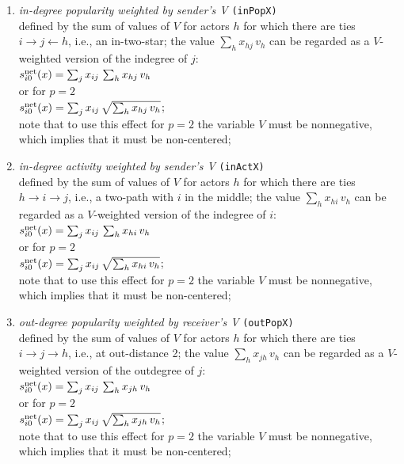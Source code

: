 \documentclass[a4paper,fleqn,11pt]{article}
\newcommand{\+}{\, + \,}
\newcommand{\vit}{\theenumi}
\begin{document}
\begin{enumerate}
 \item {\em in-degree popularity weighted by sender's V }
  \texttt{(inPopX)}\\
 defined by the sum of values of $V$ for actors $h$
 for which there are ties  $ i \rightarrow j \leftarrow h$,
 i.e., an in-two-star;
 the value $\sum_h x_{hj}\,v_h$ can be regarded as a $V$-weighted
 version of the indegree of $j$:\\
 $s^{\rm net}_{i\vit}(x) =  \sum_j x_{ij}\, \sum_h x_{hj}\,v_h  $ \\
 or for $p=2$ \\
   $s^{\rm net}_{i\vit}(x) =  \sum_j x_{ij}\, \sqrt{\sum_h x_{hj}\,v_h}   $;\\
 note that to use this effect for $p=2$ the variable $V$ must be nonnegative,
 which implies that it must be non-centered;

 \item {\em in-degree activity weighted by sender's V } \texttt{(inActX)}\\
 defined by the sum of values of $V$ for actors $h$
 for which there are ties  $h \rightarrow i \rightarrow j$,
 i.e., a two-path with $i$ in the middle;
 the value $\sum_h x_{hi}\,v_h$ can be regarded as a $V$-weighted
 version of the indegree of $i$:\\
 $s^{\rm net}_{i\vit}(x) =  \sum_j x_{ij}\, \sum_h x_{hi}\,v_h  $ \\
 or for $p=2$ \\
   $s^{\rm net}_{i\vit}(x) =  \sum_j x_{ij}\, \sqrt{\sum_h x_{hi}\,v_h}   $;\\
 note that to use this effect for $p=2$ the variable $V$ must be nonnegative,
 which implies that it must be non-centered;


 \item {\em out-degree popularity weighted by receiver's V }  \texttt{(outPopX)}\\
 defined by the sum of values of $V$ for actors $h$
 for which there are ties  $ i \rightarrow j \rightarrow h$,
 i.e., at out-distance 2;
 the value $\sum_h x_{jh}\,v_h$ can be regarded as a $V$-weighted
 version of the outdegree of $j$:\\
 $s^{\rm net}_{i\vit}(x) =  \sum_j x_{ij}\, \sum_h x_{jh}\,v_h  $ \\
 or for $p=2$ \\
   $s^{\rm net}_{i\vit}(x) =  \sum_j x_{ij}\, \sqrt{\sum_h x_{jh}\,v_h}   $;\\
 note that to use this effect for $p=2$ the variable $V$ must be nonnegative,
 which implies that it must be non-centered;


\end{enumerate}
\end{document}
